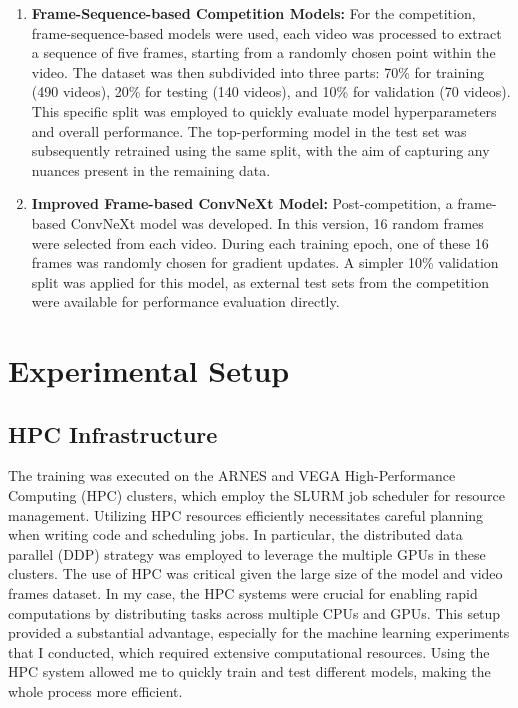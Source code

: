 \documentclass[a4paper,12pt,openright]{book}
\begin{document}
\begin{enumerate}
    \item \textbf{Frame-Sequence-based Competition Models:} For the competition, frame-sequence-based models were used, each video was processed to extract a sequence of five frames, starting from a randomly chosen point within the video. The dataset was then subdivided into three parts: 70\% for training (490 videos), 20\% for testing (140 videos), and 10\% for validation (70 videos). This specific split was employed to quickly evaluate model hyperparameters and overall performance. The top-performing model in the test set was subsequently retrained using the same split, with the aim of capturing any nuances present in the remaining data.

   \item \textbf{Improved Frame-based ConvNeXt Model:} Post-competition, a frame-based ConvNeXt model was developed. In this version, 16 random frames were selected from each video. During each training epoch, one of these 16 frames was randomly chosen for gradient updates. A simpler 10\% validation split was applied for this model, as external test sets from the competition were available for performance evaluation directly.

\end{enumerate}

\section{Experimental Setup}

\subsection{HPC Infrastructure}
The training was executed on the ARNES and VEGA High-Performance Computing (HPC) clusters, which employ the SLURM job scheduler for resource management. Utilizing HPC resources efficiently necessitates careful planning when writing code and scheduling jobs. In particular, the distributed data parallel (DDP) strategy was employed to leverage the multiple GPUs in these clusters. The use of HPC was critical given the large size of the model and video frames dataset. In my case, the HPC systems were crucial for enabling rapid computations by distributing tasks across multiple CPUs and GPUs. This setup provided a substantial advantage, especially for the machine learning experiments that I conducted, which required extensive computational resources. Using the HPC system allowed me to quickly train and test different models, making the whole process more efficient.
\end{document}
